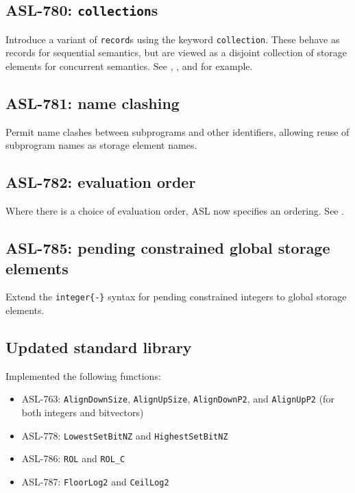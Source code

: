 \subsection{ASL-780: \texttt{collection}s}
Introduce a variant of \texttt{record}s using the keyword \texttt{collection}.
These behave as records for sequential semantics, but are viewed as a disjoint collection of storage elements for concurrent semantics.
See , , and  for example.

\subsection{ASL-781: name clashing}
Permit name clashes between subprograms and other identifiers, allowing reuse of subprogram names as storage element names.

\subsection{ASL-782: evaluation order}
Where there is a choice of evaluation order, ASL now specifies an ordering.
See .

\subsection{ASL-785: pending constrained global storage elements}
Extend the \texttt{integer\{-\}} syntax for pending constrained integers to global storage elements.

\subsection{Updated standard library}
Implemented the following functions:
\begin{itemize}
  \item ASL-763: \texttt{AlignDownSize}, \texttt{AlignUpSize}, \texttt{AlignDownP2}, and \texttt{AlignUpP2} (for both integers and bitvectors)
  \item ASL-778: \texttt{LowestSetBitNZ} and \texttt{HighestSetBitNZ}
  \item ASL-786: \texttt{ROL} and \texttt{ROL\_C}
  \item ASL-787: \texttt{FloorLog2} and \texttt{CeilLog2}
\end{itemize}

